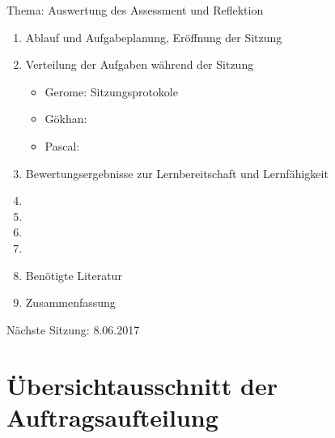Thema: Auswertung des Assessment und Reflektion
\begin{enumerate}

\item Ablauf und Aufgabeplanung, Eröffnung der Sitzung 

\item  Verteilung der Aufgaben während der Sitzung
\begin{itemize}
\item Gerome: Sitzungsprotokole
\item Gökhan: 
\item Pascal: 
\end{itemize}

\item Bewertungsergebnisse zur Lernbereitschaft und Lernfähigkeit

\item 


























\item 	

\item 	
\item 

\item Benötigte Literatur

\item Zusammenfassung

\end{enumerate}

Nächste Sitzung: 8.06.2017

\newpage

\section*{Übersichtausschnitt der Auftragsaufteilung}

